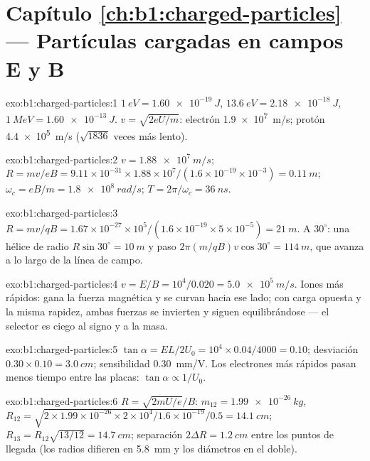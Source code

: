 \section*{Capítulo \ref{ch:b1:charged-particles} --- Partículas cargadas en campos E y B}

\begin{solution}{exo:b1:charged-particles:1}
$\qty{1}{eV} = \qty{1.60e-19}{J}$, $\qty{13.6}{eV} = \qty{2.18e-18}{J}$,
$\qty{1}{MeV} = \qty{1.60e-13}{J}$. $v = \sqrt{2eU/m}$: electrón
\qty{1.9e7}{m/s}; protón \qty{4.4e5}{m/s} ($\sqrt{1836}$ veces más lento).
\end{solution}

\begin{solution}{exo:b1:charged-particles:2}
$v = \qty{1.88e7}{m/s}$; $R = mv/eB = 9.11\times10^{-31} \times 1.88\times10^7/
(1.6\times10^{-19} \times 10^{-3}) = \qty{0.11}{m}$; $\omega_c = eB/m =
\qty{1.8e8}{rad/s}$; $T = 2\pi/\omega_c = \qty{36}{ns}$.
\end{solution}

\begin{solution}{exo:b1:charged-particles:3}
$R = mv/qB = 1.67\times10^{-27} \times 10^5/(1.6\times10^{-19} \times 5\times
10^{-5}) = \qty{21}{m}$. A $30^\circ$: una hélice de radio $R\sin 30^\circ
= \qty{10}{m}$ y paso $2\pi(m/qB)v\cos 30^\circ = \qty{114}{m}$, que avanza
a lo largo de la línea de campo.
\end{solution}

\begin{solution}{exo:b1:charged-particles:4}
$v = E/B = 10^4/0.020 = \qty{5.0e5}{m/s}$. Iones más rápidos: gana la
fuerza magnética y se curvan hacia ese lado; con carga opuesta y la misma
rapidez, ambas fuerzas se invierten y siguen equilibrándose --- el
selector es ciego al signo y a la masa.
\end{solution}

\begin{solution}{exo:b1:charged-particles:5}
$\tan\alpha = EL/2U_0 = 10^4 \times 0.04/4000 = 0.10$; desviación
$0.30 \times 0.10 = \qty{3.0}{cm}$; sensibilidad \qty{0.30}{mm/V}. Los
electrones más rápidos pasan menos tiempo entre las placas: $\tan\alpha \propto 1/U_0$.
\end{solution}

\begin{solution}{exo:b1:charged-particles:6}
$R = \sqrt{2mU/e}/B$: $m_{12} = \qty{1.99e-26}{kg}$, $R_{12} = \sqrt{2 \times
1.99\times10^{-26} \times 2\times10^4/1.6\times10^{-19}}/0.5 = \qty{14.1}{cm}$;
$R_{13} = R_{12}\sqrt{13/12} = \qty{14.7}{cm}$; separación $2\Delta R =
\qty{1.2}{cm}$ entre los puntos de llegada (los radios difieren en
\qty{5.8}{mm} y los diámetros en el doble).
\end{solution}

